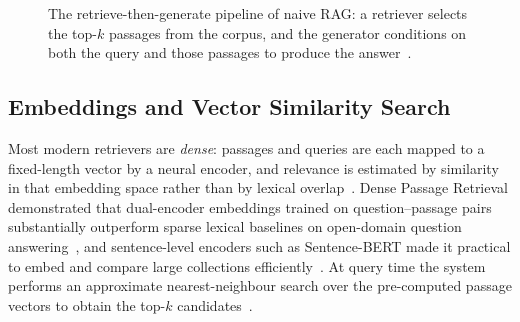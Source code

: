 \begin{figure}[htbp]
  \centering
  \caption[The retrieve-then-generate RAG pipeline]{The retrieve-then-generate pipeline of naive RAG: a retriever selects
    the top-$k$ passages from the corpus, and the generator conditions on both the
    query and those passages to produce the answer~\cite{lewis2020rag}.}
  \label{fig:gr-rag-pipeline}
\end{figure}

\subsection{Embeddings and Vector Similarity Search}

Most modern retrievers are \emph{dense}: passages and queries are each mapped to
a fixed-length vector by a neural encoder, and relevance is estimated by
similarity in that embedding space rather than by lexical
overlap~\cite{karpukhin2020dpr}. Dense Passage Retrieval demonstrated that
dual-encoder embeddings trained on question--passage pairs substantially
outperform sparse lexical baselines on open-domain question
answering~\cite{karpukhin2020dpr}, and sentence-level encoders such as
Sentence-BERT made it practical to embed and compare large collections
efficiently~\cite{reimers2019sbert}. At query time the system performs an
approximate nearest-neighbour search over the pre-computed passage vectors to
obtain the top-$k$ candidates~\cite{karpukhin2020dpr}.
